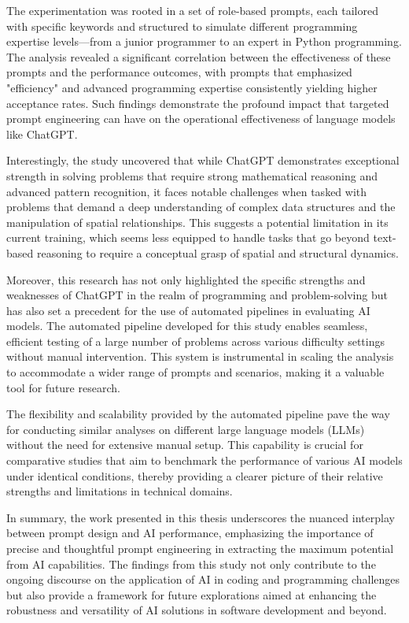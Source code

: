 The experimentation was rooted in a set of role-based prompts, each tailored with specific keywords and structured to simulate different programming expertise levels—from a junior programmer to an expert in Python programming. The analysis revealed a significant correlation between the effectiveness of these prompts and the performance outcomes, with prompts that emphasized "efficiency" and advanced programming expertise consistently yielding higher acceptance rates. Such findings demonstrate the profound impact that targeted prompt engineering can have on the operational effectiveness of language models like ChatGPT.

Interestingly, the study uncovered that while ChatGPT demonstrates exceptional strength in solving problems that require strong mathematical reasoning and advanced pattern recognition, it faces notable challenges when tasked with problems that demand a deep understanding of complex data structures and the manipulation of spatial relationships. This suggests a potential limitation in its current training, which seems less equipped to handle tasks that go beyond text-based reasoning to require a conceptual grasp of spatial and structural dynamics.

Moreover, this research has not only highlighted the specific strengths and weaknesses of ChatGPT in the realm of programming and problem-solving but has also set a precedent for the use of automated pipelines in evaluating AI models. The automated pipeline developed for this study enables seamless, efficient testing of a large number of problems across various difficulty settings without manual intervention. This system is instrumental in scaling the analysis to accommodate a wider range of prompts and scenarios, making it a valuable tool for future research.

The flexibility and scalability provided by the automated pipeline pave the way for conducting similar analyses on different large language models (LLMs) without the need for extensive manual setup. This capability is crucial for comparative studies that aim to benchmark the performance of various AI models under identical conditions, thereby providing a clearer picture of their relative strengths and limitations in technical domains.

In summary, the work presented in this thesis underscores the nuanced interplay between prompt design and AI performance, emphasizing the importance of precise and thoughtful prompt engineering in extracting the maximum potential from AI capabilities. The findings from this study not only contribute to the ongoing discourse on the application of AI in coding and programming challenges but also provide a framework for future explorations aimed at enhancing the robustness and versatility of AI solutions in software development and beyond.


